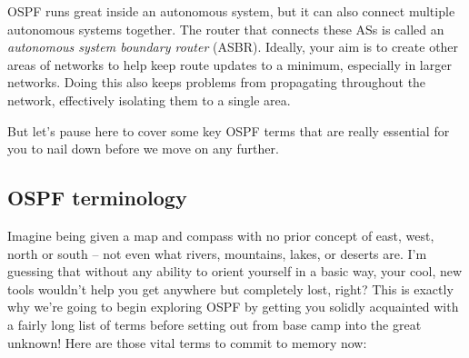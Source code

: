 OSPF runs great inside an autonomous system, but it can also connect
multiple autonomous systems together. The router that connects these ASs
is called an \emph{autonomous system boundary router} (ASBR). Ideally,
your aim is to create other areas of networks to help keep route updates
to a minimum, especially in larger networks. Doing this also keeps
problems from propagating throughout the network, effectively isolating
them to a single area.

But let's pause here to cover some key OSPF terms that are really essential for you to nail down before we move on any further.



\subsection{OSPF terminology}

Imagine being given a map and compass with no prior concept of east,
west, north or south -- not even what rivers, mountains, lakes, or
deserts are. I'm guessing that without any ability to orient yourself in
a basic way, your cool, new tools wouldn't help you get anywhere but
completely lost, right? This is exactly why we're going to begin
exploring OSPF by getting you solidly acquainted with a fairly long list of terms before setting out from base camp into the great unknown!
Here are those vital terms to commit to memory now:

